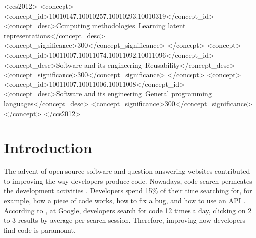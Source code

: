 \documentclass[sigconf]{acmart}
\begin{document}
\begin{CCSXML}
<ccs2012>
   <concept>
       <concept_id>10010147.10010257.10010293.10010319</concept_id>
       <concept_desc>Computing methodologies~Learning latent representations</concept_desc>
       <concept_significance>300</concept_significance>
       </concept>
   <concept>
       <concept_id>10011007.10011074.10011092.10011096</concept_id>
       <concept_desc>Software and its engineering~Reusability</concept_desc>
       <concept_significance>300</concept_significance>
       </concept>
   <concept>
       <concept_id>10011007.10011006.10011008</concept_id>
       <concept_desc>Software and its engineering~General programming languages</concept_desc>
       <concept_significance>300</concept_significance>
       </concept>
 </ccs2012>
\end{CCSXML}




\maketitle

\section{Introduction}

The advent of open source software and question answering websites contributed to improving the way developers produce code. Nowadays, code search permeates the development activities \citep{towards-summarizing-source-code-search:marin:2020}. Developers spend 15\% of their time searching for, for example, how a piece of code works, how to fix a bug, and how to use an API \cite{what-developers-search-for-on-the-web:xia:2017}. According to \citet{sadowski-how-developers-search-for-code-case-study:2015}, at Google, developers search for code 12 times a day, clicking on 2 to 3 results by average per search session. Therefore, improving how developers find code is paramount.  
\end{document}
